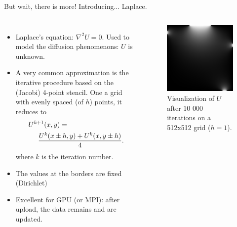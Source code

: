 \begin{frame}{But wait, there is more! Introducing... Laplace.}
	\begin{columns}
	\begin{itemize}
		\item Laplace's equation: $\nabla^2 U = 0$. Used to model the diffusion phenomenons: $U$ is unknown.
		\item A very common approximation is the iterative procedure based on the (Jacobi) 4-point stencil. One a grid with evenly spaced (of $h$) points, it reduces to\begin{align*}
			&U^{k+1}(x,y) = \\
			&\hspace{.5cm}\frac{U^k(x\pm h,y)+U^k(x,y\pm h)}{4}.
		\end{align*}
		where $k$ is the iteration number.
		\item The values at the borders are fixed (Dirichlet)
		\item Excellent for GPU (or MPI): after upload, the data remains and are updated.
		\end{itemize}
	\begin{figure}
		\centering
		\includegraphics[width=\textwidth]{im/Laplace}
		\caption{Visualization of $U$ after 10 000 iterations on a 512x512 grid ($h=1$).}
	\end{figure}
	\end{columns}
\end{frame}

